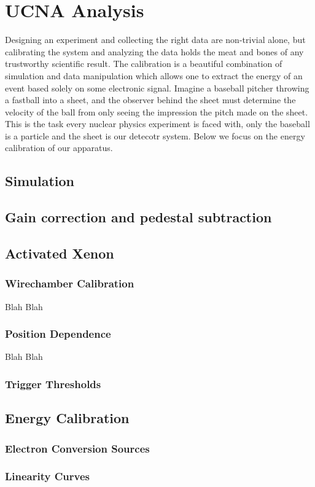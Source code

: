 \chapter{UCNA Analysis}
\label{ch:UCNA_Analysis}

Designing an experiment and collecting the right data are non-trivial alone,
but calibrating the system and analyzing the data holds the meat and bones of
any trustworthy scientific result. The calibration is a beautiful combination
of simulation and data manipulation which allows one to extract the energy of
an event based solely on some electronic signal. Imagine a baseball pitcher
throwing a fastball into a sheet, and the observer behind the sheet must
determine the velocity of the ball from only seeing the impression the pitch
made on the sheet. This is the task every nuclear physics experiment is faced
with, only the baseball is a particle and the sheet is our detecotr system.
Below we focus on the energy calibration of our apparatus.


\section{Simulation}
\label{sec:Simulation}


\section{Gain correction and pedestal subtraction}

\section{Activated Xenon}
\subsection{Wirechamber Calibration}

Blah Blah

\subsection{Position Dependence}

Blah Blah

\subsection{Trigger Thresholds}

\section{Energy Calibration}
\subsection{Electron Conversion Sources}
\subsection{Linearity Curves}








